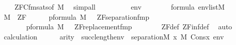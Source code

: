 \begin{isabellebody}
\ \ \ \ \isamarkupfalse%
\ ZFC{\isacharunderscore}{\kern0pt}fm{\isacharunderscore}{\kern0pt}sats{\isacharbrackleft}{\kern0pt}of\ M{\isacharbrackright}{\kern0pt}\ \isamarkupfalse%
\ simp{\isacharunderscore}{\kern0pt}all\isanewline
\ \ \isacommand{{\isacharbraceleft}{\kern0pt}}\isamarkupfalse%
\isanewline
\ \ \ \ \isamarkupfalse%
\ {\isasymphi}\ env\isanewline
\ \ \ \ \isamarkupfalse%
\ {\isachardoublequoteopen}{\isasymphi}\ {\isasymin}\ formula{\isachardoublequoteclose}\ {\isachardoublequoteopen}env{\isasymin}list{\isacharparenleft}{\kern0pt}M{\isacharparenright}{\kern0pt}{\isachardoublequoteclose}\ \isanewline
\ \ \ \ \isamarkupfalse%
\ \isamarkupfalse%
\ {\isacartoucheopen}M\ {\isasymTurnstile}\ ZF{\isacartoucheclose}\isanewline
\ \ \ \ \isamarkupfalse%
\ {\isachardoublequoteopen}{\isasymforall}p{\isasymin}formula{\isachardot}{\kern0pt}\ {\isacharparenleft}{\kern0pt}M{\isacharcomma}{\kern0pt}\ {\isacharbrackleft}{\kern0pt}{\isacharbrackright}{\kern0pt}\ {\isasymTurnstile}\ {\isacharparenleft}{\kern0pt}ZF{\isacharunderscore}{\kern0pt}separation{\isacharunderscore}{\kern0pt}fm{\isacharparenleft}{\kern0pt}p{\isacharparenright}{\kern0pt}{\isacharparenright}{\kern0pt}{\isacharparenright}{\kern0pt}{\isachardoublequoteclose}\ \isanewline
\ \ \ \ \ \ \ \ \ {\isachardoublequoteopen}{\isasymforall}p{\isasymin}formula{\isachardot}{\kern0pt}\ {\isacharparenleft}{\kern0pt}M{\isacharcomma}{\kern0pt}\ {\isacharbrackleft}{\kern0pt}{\isacharbrackright}{\kern0pt}\ {\isasymTurnstile}\ {\isacharparenleft}{\kern0pt}ZF{\isacharunderscore}{\kern0pt}replacement{\isacharunderscore}{\kern0pt}fm{\isacharparenleft}{\kern0pt}p{\isacharparenright}{\kern0pt}{\isacharparenright}{\kern0pt}{\isacharparenright}{\kern0pt}{\isachardoublequoteclose}\isanewline
\ \ \ \ \ \ \isamarkupfalse%
\ ZF{\isacharunderscore}{\kern0pt}def\ ZF{\isacharunderscore}{\kern0pt}inf{\isacharunderscore}{\kern0pt}def\ \isamarkupfalse%
\ auto\isanewline
\ \ \ \ \isamarkupfalse%
\ \isamarkupfalse%
\ calculation\isanewline
\ \ \ \ \isamarkupfalse%
\ {\isachardoublequoteopen}arity{\isacharparenleft}{\kern0pt}{\isasymphi}{\isacharparenright}{\kern0pt}\ {\isasymle}\ succ{\isacharparenleft}{\kern0pt}length{\isacharparenleft}{\kern0pt}env{\isacharparenright}{\kern0pt}{\isacharparenright}{\kern0pt}\ {\isasymLongrightarrow}\ separation{\isacharparenleft}{\kern0pt}{\isacharhash}{\kern0pt}{\isacharhash}{\kern0pt}M{\isacharcomma}{\kern0pt}\ {\isasymlambda}x{\isachardot}{\kern0pt}\ {\isacharparenleft}{\kern0pt}M{\isacharcomma}{\kern0pt}\ Cons{\isacharparenleft}{\kern0pt}x{\isacharcomma}{\kern0pt}\ env{\isacharparenright}{\kern0pt}\ {\isasymTurnstile}\ {\isasymphi}{\isacharparenright}{\kern0pt}{\isacharparenright}{\kern0pt}{\isachardoublequoteclose}\isanewline

\end{isabellebody}
